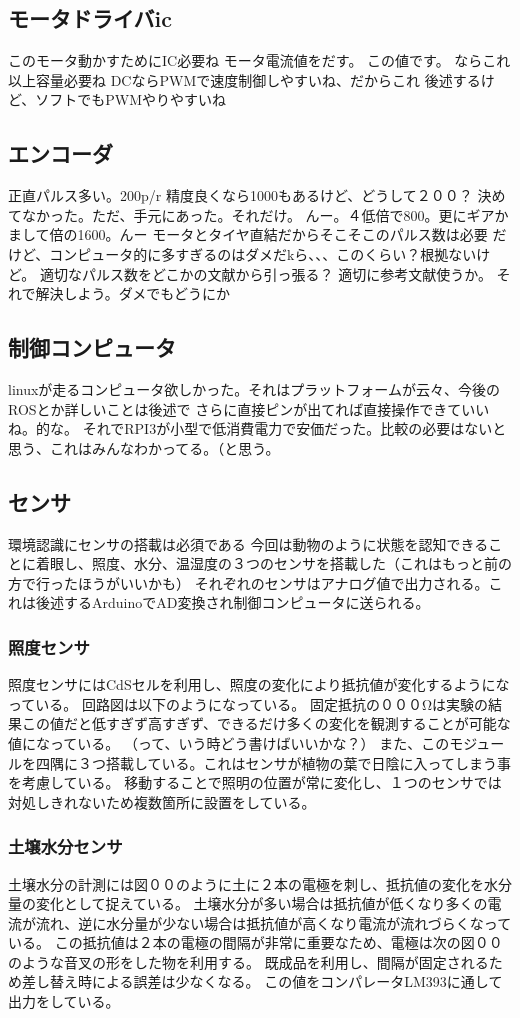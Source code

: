\subsection{モータドライバic}
このモータ動かすためにIC必要ね
モータ電流値をだす。
この値です。
ならこれ以上容量必要ね
DCならPWMで速度制御しやすいね、だからこれ
後述するけど、ソフトでもPWMやりやすいね
\subsection{エンコーダ}
正直パルス多い。200p/r
精度良くなら1000もあるけど、どうして２００？
決めてなかった。ただ、手元にあった。それだけ。
んー。４低倍で800。更にギアかまして倍の1600。んー
モータとタイヤ直結だからそこそこのパルス数は必要
だけど、コンピュータ的に多すぎるのはダメだkら、、、このくらい？根拠ないけど。
適切なパルス数をどこかの文献から引っ張る？
適切に参考文献使うか。
それで解決しよう。ダメでもどうにか
\subsection{制御コンピュータ}
linuxが走るコンピュータ欲しかった。それはプラットフォームが云々、今後のROSとか詳しいことは後述で
さらに直接ピンが出てれば直接操作できていいね。的な。
それでRPI3が小型で低消費電力で安価だった。比較の必要はないと思う、これはみんなわかってる。（と思う。
\subsection{センサ}
環境認識にセンサの搭載は必須である
今回は動物のように状態を認知できることに着眼し、照度、水分、温湿度の３つのセンサを搭載した（これはもっと前の方で行ったほうがいいかも）
それぞれのセンサはアナログ値で出力される。これは後述するArduinoでAD変換され制御コンピュータに送られる。
\subsubsection{照度センサ}
照度センサにはCdSセルを利用し、照度の変化により抵抗値が変化するようになっている。
回路図は以下のようになっている。
固定抵抗の０００Ωは実験の結果この値だと低すぎず高すぎず、できるだけ多くの変化を観測することが可能な値になっている。
（って、いう時どう書けばいいかな？）
また、このモジュールを四隅に３つ搭載している。これはセンサが植物の葉で日陰に入ってしまう事を考慮している。
移動することで照明の位置が常に変化し、１つのセンサでは対処しきれないため複数箇所に設置をしている。
\subsubsection{土壌水分センサ}
土壌水分の計測には図００のように土に２本の電極を刺し、抵抗値の変化を水分量の変化として捉えている。
土壌水分が多い場合は抵抗値が低くなり多くの電流が流れ、逆に水分量が少ない場合は抵抗値が高くなり電流が流れづらくなっている。
この抵抗値は２本の電極の間隔が非常に重要なため、電極は次の図００のような音叉の形をした物を利用する。
既成品を利用し、間隔が固定されるため差し替え時による誤差は少なくなる。
この値をコンパレータLM393に通して出力をしている。

